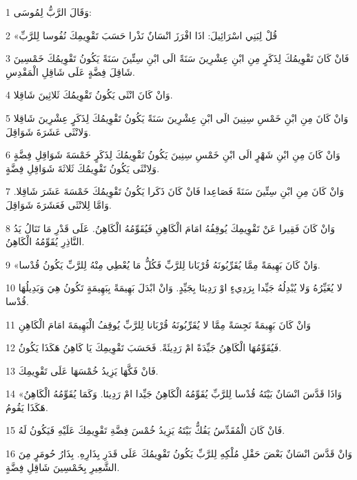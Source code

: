 \par 1 وَقَالَ الرَّبُّ لِمُوسَى:
\par 2 «قُلْ لِبَنِي اسْرَائِيلَ: اذَا افْرَزَ انْسَانٌ نَذْرا حَسَبَ تَقْوِيمِكَ نُفُوسا لِلرَّبِّ
\par 3 فَانْ كَانَ تَقْوِيمُكَ لِذَكَرٍ مِنِ ابْنِ عِشْرِينَ سَنَةً الَى ابْنِ سِتِّينَ سَنَةً يَكُونُ تَقْوِيمُكَ خَمْسِينَ شَاقِلَ فِضَّةٍ عَلَى شَاقِلِ الْمَقْدِسِ.
\par 4 وَانْ كَانَ انْثَى يَكُونُ تَقْوِيمُكَ ثَلاثِينَ شَاقِلا.
\par 5 وَانْ كَانَ مِنِ ابْنِ خَمْسِ سِنِينَ الَى ابْنِ عِشْرِينَ سَنَةً يَكُونُ تَقْوِيمُكَ لِذَكَرٍ عِشْرِينَ شَاقِلا وَلانْثَى عَشَرَةَ شَوَاقِلَ.
\par 6 وَانْ كَانَ مِنِ ابْنِ شَهْرٍ الَى ابْنِ خَمْسِ سِنِينَ يَكُونُ تَقْوِيمُكَ لِذَكَرٍ خَمْسَةَ شَوَاقِلِ فِضَّةٍ وَلِانْثَى يَكُونُ تَقْوِيمُكَ ثَلاثَةَ شَوَاقِلِ فِضَّةٍ.
\par 7 وَانْ كَانَ مِنِ ابْنِ سِتِّينَ سَنَةً فَصَاعِدا فَانْ كَانَ ذَكَرا يَكُونُ تَقْوِيمُكَ خَمْسَةَ عَشَرَ شَاقِلا. وَامَّا لِلانْثَى فَعَشَرَةَ شَوَاقِلَ.
\par 8 وَانْ كَانَ فَقِيرا عَنْ تَقْوِيمِكَ يُوقِفُهُ امَامَ الْكَاهِنِ فَيُقَوِّمُهُ الْكَاهِنُ. عَلَى قَدْرِ مَا تَنَالُ يَدُ النَّاذِرِ يُقَوِّمُهُ الْكَاهِنُ.
\par 9 «وَانْ كَانَ بَهِيمَةً مِمَّا يُقَرِّبُونَهُ قُرْبَانا لِلرَّبِّ فَكُلُّ مَا يُعْطِي مِنْهُ لِلرَّبِّ يَكُونُ قُدْسا.
\par 10 لا يُغَيِّرُهُ وَلا يُبْدِلُهُ جَيِّدا بِرَدِيءٍ اوْ رَدِيئا بِجَيِّدٍ. وَانْ ابْدَلَ بَهِيمَةً بِبَهِيمَةٍ تَكُونُ هِيَ وَبَدِيلُهَا قُدْسا.
\par 11 وَانْ كَانَ بَهِيمَةً نَجِسَةً مِمَّا لا يُقَرِّبُونَهُ قُرْبَانا لِلرَّبِّ يُوقِفُ الْبَهِيمَةَ امَامَ الْكَاهِنِ
\par 12 فَيُقَوِّمُهَا الْكَاهِنُ جَيِّدَةً امْ رَدِيئَةً. فَحَسَبَ تَقْوِيمِكَ يَا كَاهِنُ هَكَذَا يَكُونُ.
\par 13 فَانْ فَكَّهَا يَزِيدُ خُمْسَهَا عَلَى تَقْوِيمِكَ.
\par 14 «وَاذَا قَدَّسَ انْسَانٌ بَيْتَهُ قُدْسا لِلرَّبِّ يُقَوِّمُهُ الْكَاهِنُ جَيِّدا امْ رَدِيئا. وَكَمَا يُقَوِّمُهُ الْكَاهِنُ هَكَذَا يَقُومُ.
\par 15 فَانْ كَانَ الْمُقَدِّسُ يَفُكُّ بَيْتَهُ يَزِيدُ خُمْسَ فِضَّةِ تَقْوِيمِكَ عَلَيْهِ فَيَكُونُ لَهُ.
\par 16 وَانْ قَدَّسَ انْسَانٌ بَعْضَ حَقْلِ مُلْكِهِ لِلرَّبِّ يَكُونُ تَقْوِيمُكَ عَلَى قَدَرِ بِذَارِهِ. بِذَارُ حُومَرٍ مِنَ الشَّعِيرِ بِخَمْسِينَ شَاقِلِ فِضَّةٍ.
